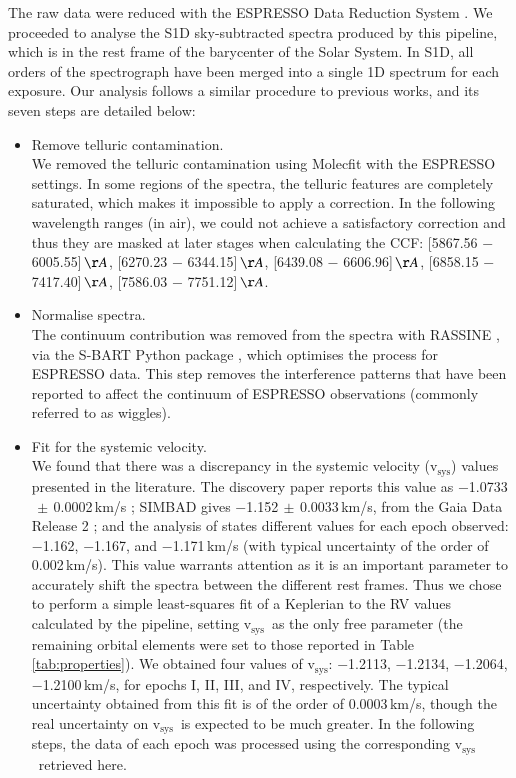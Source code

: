 \documentclass{aa}
\newcommand{\vsys}{v$_\mathrm{sys}$}
\begin{document}
The raw data were reduced with the ESPRESSO Data Reduction System \citep[DRS, version 3.0.0,][]{pepe2021}. We proceeded to analyse the S1D sky-subtracted spectra produced by this pipeline, which is in the rest frame of the barycenter of the Solar System. In S1D, all orders of the spectrograph have been merged into a single 1D spectrum for each exposure. Our analysis follows a similar procedure to previous works, and its seven steps are detailed below:


\begin{itemize}
    \item Remove telluric contamination.\\
    We removed the telluric contamination using Molecfit \citep[version 4.2,][]{smette2015, kausch2015} with the ESPRESSO settings. In some regions of the spectra, the telluric features are completely saturated, which makes it impossible to apply a correction. In the following wavelength ranges (in air), we could not achieve a satisfactory correction and thus they are masked at later stages when calculating the CCF: [5867.56 $-$ 6005.55]\,$\AA$, [6270.23 $-$ 6344.15]\,$\AA$, [6439.08 $-$ 6606.96]\,$\AA$, [6858.15 $-$ 7417.40]\,$\AA$, [7586.03 $-$ 7751.12]\,$\AA$.

    \item Normalise spectra.\\
    The continuum contribution was removed from the spectra with RASSINE \citep{cretignier2020}, via the S-BART Python package \citep{silva2022}, which optimises the process for ESPRESSO data. This step removes the interference patterns that have been reported to affect the continuum of ESPRESSO observations (commonly referred to as wiggles).

    \item Fit for the systemic velocity.\\
    We found that there was a discrepancy in the systemic velocity (\vsys) values presented in the literature. The discovery paper reports this value as $-$1.0733$\,\pm\,$0.0002\,km/s \citep{west2016}; SIMBAD gives $-$1.152$\,\pm\,$0.0033\,km/s, from the Gaia Data Release 2 \citep{soubiran2018}; and the analysis of \citet{ehrenreich2020} states different values for each epoch observed: $-$1.162, $-$1.167, and $-$1.171\,km/s (with typical uncertainty of the order of 0.002\,km/s). This value warrants attention as it is an important parameter to accurately shift the spectra between the different rest frames. Thus we chose to perform a simple least-squares fit of a Keplerian to the RV values calculated by the pipeline, setting \vsys\ as the only free parameter (the remaining orbital elements were set to those reported in Table \ref{tab:properties}). We obtained four values of \vsys: $-$1.2113, $-$1.2134, $-$1.2064, $-$1.2100\,km/s, for epochs I, II, III, and IV, respectively. The typical uncertainty obtained from this fit is of the order of 0.0003\,km/s, though the real uncertainty on \vsys\ is expected to be much greater. In the following steps, the data of each epoch was processed using the corresponding \vsys\ retrieved here.


\end{itemize}
\end{document}
